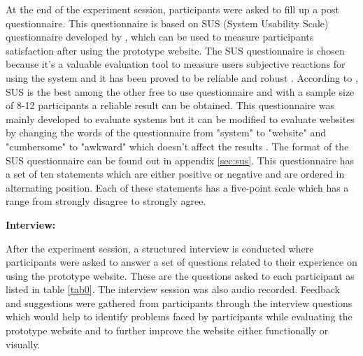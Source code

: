 \documentclass[mscthesis]{usiinfthesis}
\begin{document}
At the end of the experiment session, participants were asked to fill up a post questionnaire. This questionnaire is based on SUS (System Usability Scale) questionnaire developed by \citeauthor{brooke_sus-quick_1996}, which can be used to measure participants satisfaction after using the prototype website. The SUS questionnaire is chosen because it's a valuable evaluation tool to measure users subjective reactions for using the system and it has been proved to be reliable and robust \citep{brooke_sus:_2013}. According to \citeauthor{tullis_comparison_2004}, SUS is the best among the other free to use questionnaire and with a sample size of 8-12 participants a reliable result can be obtained. This questionnaire was mainly developed to evaluate systems but it can be modified to evaluate websites by changing the words of the questionnaire from "system" to "website" and "cumbersome" to "awkward" which doesn't affect the results \citep{bangor_determining_2009}. The format of the SUS questionnaire can be found out in appendix \ref{sec:sus}. This questionnaire has a set of ten statements which are either positive or negative and are ordered in alternating position. Each of these statements has a five-point scale which has a range from strongly disagree to strongly agree.
\newline

\textbf{Interview:} 

After the experiment session, a structured interview is conducted where participants were asked to answer a set of questions related to their experience on using the prototype website. These are the questions asked to each participant as listed in table \ref{tab0}. The interview session was also audio recorded. Feedback and suggestions were gathered from participants through the interview questions which would help to identify problems faced by participants while evaluating the prototype website and to further improve the website either functionally or visually.
\newline
\end{document}

